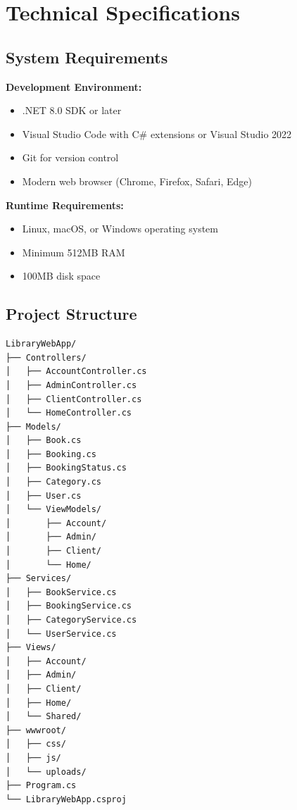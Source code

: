 \documentclass[12pt,a4paper]{article}
\begin{document}
\newpage
\appendix
\section{Technical Specifications}

\subsection{System Requirements}

\textbf{Development Environment:}
\begin{itemize}[leftmargin=*]
    \item .NET 8.0 SDK or later
    \item Visual Studio Code with C\# extensions or Visual Studio 2022
    \item Git for version control
    \item Modern web browser (Chrome, Firefox, Safari, Edge)
\end{itemize}

\textbf{Runtime Requirements:}
\begin{itemize}[leftmargin=*]
    \item Linux, macOS, or Windows operating system
    \item Minimum 512MB RAM
    \item 100MB disk space
\end{itemize}

\subsection{Project Structure}

\begin{verbatim}
LibraryWebApp/
├── Controllers/
│   ├── AccountController.cs
│   ├── AdminController.cs
│   ├── ClientController.cs
│   └── HomeController.cs
├── Models/
│   ├── Book.cs
│   ├── Booking.cs
│   ├── BookingStatus.cs
│   ├── Category.cs
│   ├── User.cs
│   └── ViewModels/
│       ├── Account/
│       ├── Admin/
│       ├── Client/
│       └── Home/
├── Services/
│   ├── BookService.cs
│   ├── BookingService.cs
│   ├── CategoryService.cs
│   └── UserService.cs
├── Views/
│   ├── Account/
│   ├── Admin/
│   ├── Client/
│   ├── Home/
│   └── Shared/
├── wwwroot/
│   ├── css/
│   ├── js/
│   └── uploads/
├── Program.cs
└── LibraryWebApp.csproj
\end{verbatim}
\end{document}
